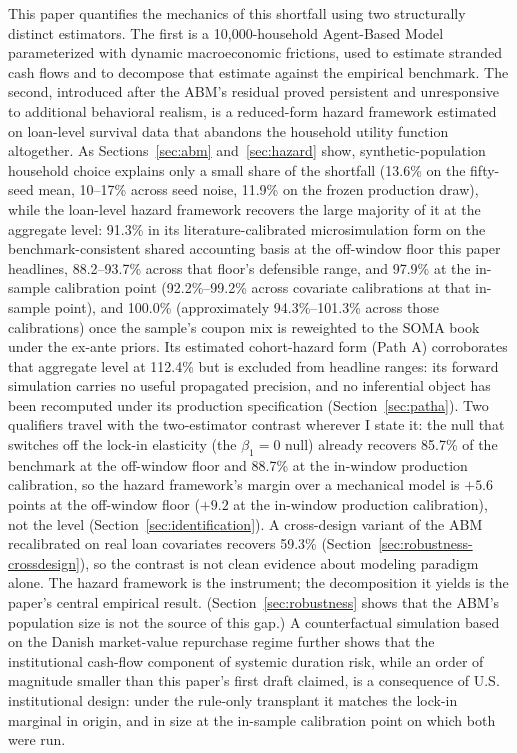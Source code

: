 \documentclass[12pt]{article}
\begin{document}
This paper quantifies the mechanics of this shortfall using two structurally distinct estimators. The first is a 10,000-household Agent-Based Model parameterized with dynamic macroeconomic frictions, used to estimate stranded cash flows and to decompose that estimate against the empirical benchmark. The second, introduced after the ABM's residual proved persistent and unresponsive to additional behavioral realism, is a reduced-form hazard framework estimated on loan-level survival data that abandons the household utility function altogether. As Sections~\ref{sec:abm} and~\ref{sec:hazard} show, synthetic-population household choice explains only a small share of the shortfall (13.6\% on the fifty-seed mean, 10--17\% across seed noise, 11.9\% on the frozen production draw), while the loan-level hazard framework recovers the large majority of it at the aggregate level: 91.3\% in its literature-calibrated microsimulation form on the benchmark-consistent shared accounting basis at the off-window floor this paper headlines, 88.2--93.7\% across that floor's defensible range, and 97.9\% at the in-sample calibration point (92.2\%--99.2\% across covariate calibrations at that in-sample point), and 100.0\% (approximately 94.3\%--101.3\% across those calibrations) once the sample's coupon mix is reweighted to the SOMA book under the ex-ante priors. Its estimated cohort-hazard form (Path A) corroborates that aggregate level at 112.4\% but is excluded from headline ranges: its forward simulation carries no useful propagated precision, and no inferential object has been recomputed under its production specification (Section~\ref{sec:patha}). Two qualifiers travel with the two-estimator contrast wherever I state it: the null that switches off the lock-in elasticity (the $\beta_1 = 0$ null) already recovers 85.7\% of the benchmark at the off-window floor and 88.7\% at the in-window production calibration, so the hazard framework's margin over a mechanical model is $+5.6$ points at the off-window floor ($+9.2$ at the in-window production calibration), not the level (Section~\ref{sec:identification}). A cross-design variant of the ABM recalibrated on real loan covariates recovers 59.3\% (Section~\ref{sec:robustness-crossdesign}), so the contrast is not clean evidence about modeling paradigm alone. The hazard framework is the instrument; the decomposition it yields is the paper's central empirical result. (Section~\ref{sec:robustness} shows that the ABM's population size is not the source of this gap.) A counterfactual simulation based on the Danish market-value repurchase regime further shows that the institutional cash-flow component of systemic duration risk, while an order of magnitude smaller than this paper's first draft claimed, is a consequence of U.S. institutional design: under the rule-only transplant it matches the lock-in marginal in origin, and in size at the in-sample calibration point on which both were run.
\end{document}
